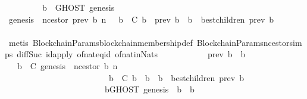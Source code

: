 \begin{isabellebody}
\ \ \ \ \ \ \ \ \ {\isachardoublequoteopen}b{\isacharprime}{\isacharprime}\ {\isasymin}\ GHOST\ {\isacharparenleft}{\isacharbraceleft}genesis{\isacharbraceright}{\isacharcomma}\ {\isasymsigma}{\isacharparenright}{\isachardoublequoteclose}\isanewline
\ \ \ \ \ \ \ \ \isamarkupfalse%
\ \isamarkupfalse%
\ {\isachardoublequoteopen}genesis\ {\isacharequal}\ n{\isacharunderscore}cestor\ {\isacharparenleft}prev\ b{\isacharcomma}\ n{\isacharparenright}\ {\isasymand}\ {\isacharparenleft}{\isasymforall}\ b{\isacharprime}\ {\isasymin}\ C{\isachardot}\ b{\isacharprime}\ {\isasymdownharpoonright}\ prev\ b\ {\isasymlongrightarrow}\ b{\isacharprime}\ {\isasymin}\ best{\isacharunderscore}children\ {\isacharparenleft}prev\ b{\isacharprime}{\isacharcomma}\ {\isasymsigma}{\isacharparenright}{\isacharparenright}{\isachardoublequoteclose}\isanewline
\ \ \ \ \ \ \ \ \ \ \isamarkupfalse%
\ {\isacharparenleft}metis\ BlockchainParams{\isachardot}blockchain{\isacharunderscore}membership{\isacharunderscore}def\ BlockchainParams{\isachardot}n{\isacharunderscore}cestor{\isachardot}simps{\isacharparenleft}{}{\isacharparenright}\ diff{\isacharunderscore}Suc{\isacharunderscore}{}\ id{\isacharunderscore}apply\ of{\isacharunderscore}nat{\isacharunderscore}eq{\isacharunderscore}id\ of{\isacharunderscore}nat{\isacharunderscore}in{\isacharunderscore}Nats{\isacharparenright}\isanewline
\ \ \ \ \ \ \ \ \isamarkupfalse%
\ \isamarkupfalse%
\ {\isachardoublequoteopen}prev\ b\ {\isasymdownharpoonright}\ b{\isacharprime}{\isacharprime}{\isachardoublequoteclose}\isanewline
\ \ \ \ \ \ \ \ \ \ \isamarkupfalse%
\ {\isacartoucheopen}{\isasymforall}{\isasymsigma}{\isasymin}{\isasymSigma}{\isachardot}\ {\isasymforall}\ b\ {\isasymin}\ C{\isachardot}\ genesis\ {\isacharequal}\ n{\isacharunderscore}cestor\ {\isacharparenleft}b{\isacharcomma}\ n{\isacharparenright}\ {\isasymand}\isanewline
\ \ \ \ \ \ \ \ \ \ \ \ \ \ \ \ \ \ \ \ \ \ \ \ {\isacharparenleft}{\isasymforall}\ b{\isacharprime}\ {\isasymin}\ C{\isachardot}\ b{\isacharprime}\ {\isasymdownharpoonright}\ b\ {\isasymlongrightarrow}\ b{\isacharprime}\ {\isasymin}\ best{\isacharunderscore}children\ {\isacharparenleft}prev\ b{\isacharprime}{\isacharcomma}\ {\isasymsigma}{\isacharparenright}{\isacharparenright}\ {\isasymlongrightarrow}\isanewline
\ \ \ \ \ \ \ \ \ \ \ \ \ \ \ \ \ \ \ \ \ \ \ \ {\isacharparenleft}{\isasymforall}b{\isacharprime}{\isacharprime}{\isasymin}GHOST\ {\isacharparenleft}{\isacharbraceleft}genesis{\isacharbraceright}{\isacharcomma}\ {\isasymsigma}{\isacharparenright}{\isachardot}\ b\ {\isasymdownharpoonright}\ b{\isacharprime}{\isacharprime}{\isacharparenright}{\isacartoucheclose}\isanewline

\end{isabellebody}
